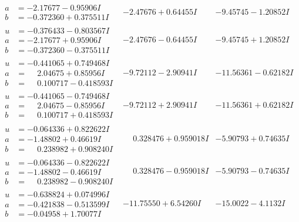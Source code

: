 \documentclass[1p]{elsarticle_modified}
\theoremstyle{definition}
\begin{document}
$$\begin{array}{c|c|c}
\begin{aligned}
a &= -2.17677 - 0.95906 I \\
b &= -0.372360 + 0.375511 I\end{aligned}
 & -2.47676 + 0.64455 I & -9.45745 - 1.20852 I \\ \hline\begin{aligned}
u &= -0.376433 - 0.803567 I \\
a &= -2.17677 + 0.95906 I \\
b &= -0.372360 - 0.375511 I\end{aligned}
 & -2.47676 - 0.64455 I & -9.45745 + 1.20852 I \\ \hline\begin{aligned}
u &= -0.441065 + 0.749468 I \\
a &= \phantom{-}2.04675 + 0.85956 I \\
b &= \phantom{-}0.100717 - 0.418593 I\end{aligned}
 & -9.72112 - 2.90941 I & -11.56361 - 0.62182 I \\ \hline\begin{aligned}
u &= -0.441065 - 0.749468 I \\
a &= \phantom{-}2.04675 - 0.85956 I \\
b &= \phantom{-}0.100717 + 0.418593 I\end{aligned}
 & -9.72112 + 2.90941 I & -11.56361 + 0.62182 I \\ \hline\begin{aligned}
u &= -0.064336 + 0.822622 I \\
a &= -1.48802 + 0.46619 I \\
b &= \phantom{-}0.238982 + 0.908240 I\end{aligned}
 & \phantom{-}0.328476 + 0.959018 I & -5.90793 + 0.74635 I \\ \hline\begin{aligned}
u &= -0.064336 - 0.822622 I \\
a &= -1.48802 - 0.46619 I \\
b &= \phantom{-}0.238982 - 0.908240 I\end{aligned}
 & \phantom{-}0.328476 - 0.959018 I & -5.90793 - 0.74635 I \\ \hline\begin{aligned}
u &= -0.638824 + 0.074996 I \\
a &= -0.421838 - 0.513599 I \\
b &= -0.04958 + 1.70077 I\end{aligned}
 & -11.75550 + 6.54260 I & -15.0022 - 4.1132 I \\ \hline\begin{aligned}

\end{aligned}
\end{array}$$
\end{document}
